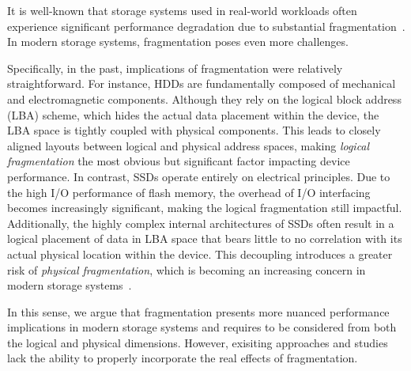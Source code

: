 

%
%
%

It is well-known that storage systems used in real-world workloads often experience significant performance degradation due to substantial fragmentation~\cite{NEEDED}.
In modern storage systems, fragmentation poses even more challenges.

Specifically, in the past, implications of fragmentation were relatively straightforward.
For instance, HDDs are fundamentally composed of mechanical and electromagnetic components.
Although they rely on the logical block address (LBA) scheme, which hides the actual data placement within the device, the LBA space is tightly coupled with physical components.
This leads to closely aligned layouts between logical and physical address spaces, making \emph{logical fragmentation} the most obvious but significant factor impacting device performance.
In contrast, SSDs operate entirely on electrical principles.
Due to the high I/O performance of flash memory, the overhead of I/O interfacing becomes increasingly significant, making the logical fragmentation still impactful.
Additionally, the highly complex internal architectures of SSDs often result in a logical placement of data in LBA space that bears little to no correlation with its actual physical location within the device.
This decoupling introduces a greater risk of \emph{physical fragmentation}, which is becoming an increasing concern in modern storage systems~\cite{NEEDED,NEEDED}.


In this sense, we argue that fragmentation presents more nuanced performance implications in modern storage systems and requires to be considered from both the logical and physical dimensions.
However, exisiting approaches and studies lack the ability to properly incorporate the real effects of fragmentation.

